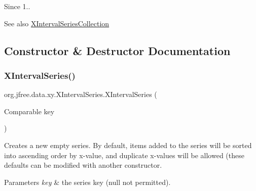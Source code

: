 \begin{DoxySince}{Since}
1..
\end{DoxySince}
\begin{DoxySeeAlso}{See also}
\mbox{\hyperlink{classorg_1_1jfree_1_1data_1_1xy_1_1_x_interval_series_collection}{X\+Interval\+Series\+Collection}} 
\end{DoxySeeAlso}


\subsection{Constructor \& Destructor Documentation}
\mbox{\label{classorg_1_1jfree_1_1data_1_1xy_1_1_x_interval_series_a9434fec432a254da18b8d9c3543d5d17}} 
\subsubsection{\texorpdfstring{X\+Interval\+Series()}{XIntervalSeries()}\hspace{0.1cm}{\footnotesize\ttfamily [1/2]}}
{\footnotesize\ttfamily org.\+jfree.\+data.\+xy.\+X\+Interval\+Series.\+X\+Interval\+Series (\begin{DoxyParamCaption}\item[{Comparable}]{key }\end{DoxyParamCaption})}

Creates a new empty series. By default, items added to the series will be sorted into ascending order by x-\/value, and duplicate x-\/values will be allowed (these defaults can be modified with another constructor.


\begin{DoxyParams}{Parameters}
{\em key} & the series key ({\ttfamily null} not permitted). \\
\hline
\end{DoxyParams}
\mbox{\label{classorg_1_1jfree_1_1data_1_1xy_1_1_x_interval_series_a3f8eeebda6207bba7c6e3e267fa8b2e0}} 
